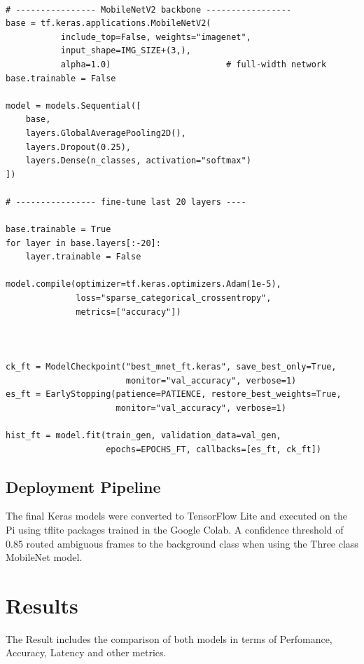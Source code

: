 \documentclass[a4paper,12pt]{article}
\begin{document}
\begin{lstlisting}[caption={MobileNet V2 Model Architecture},
                   label={lst:aug3}]

# ---------------- MobileNetV2 backbone -----------------                   
base = tf.keras.applications.MobileNetV2(
           include_top=False, weights="imagenet",
           input_shape=IMG_SIZE+(3,),
           alpha=1.0)                       # full-width network
base.trainable = False

model = models.Sequential([
    base,
    layers.GlobalAveragePooling2D(),
    layers.Dropout(0.25),
    layers.Dense(n_classes, activation="softmax")
])

# ---------------- fine-tune last 20 layers ----

base.trainable = True
for layer in base.layers[:-20]:
    layer.trainable = False

model.compile(optimizer=tf.keras.optimizers.Adam(1e-5),
              loss="sparse_categorical_crossentropy",
              metrics=["accuracy"])



ck_ft = ModelCheckpoint("best_mnet_ft.keras", save_best_only=True,
                        monitor="val_accuracy", verbose=1)
es_ft = EarlyStopping(patience=PATIENCE, restore_best_weights=True,
                      monitor="val_accuracy", verbose=1)

hist_ft = model.fit(train_gen, validation_data=val_gen,
                    epochs=EPOCHS_FT, callbacks=[es_ft, ck_ft])
\end{lstlisting}

\subsection{Deployment Pipeline}
The final Keras models were converted to TensorFlow Lite and executed on the Pi using tflite packages trained in the Google Colab. A confidence threshold of 0.85 routed ambiguous frames to the background class when using the Three class MobileNet model.

\section{Results}
The Result includes the comparison of both models in terms of Perfomance, Accuracy, Latency and other metrics.
\end{document}
